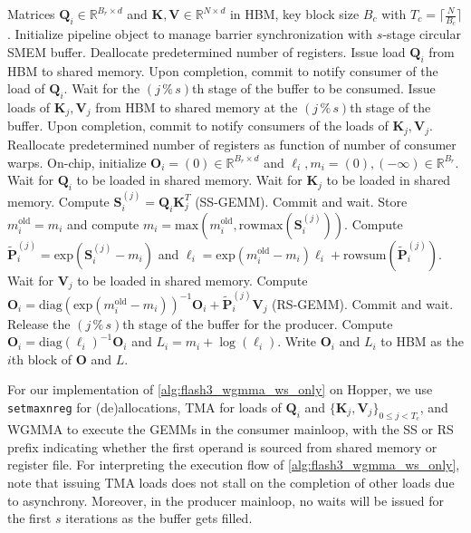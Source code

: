 \documentclass{article}
\renewcommand{\max}{\mathrm{max}}
\renewcommand{\exp}{\mathrm{exp}}
\newcommand{\diag}{\mathrm{diag}}
\newcommand{\rowmax}{\mathrm{rowmax}}
\newcommand{\rowsum}{\mathrm{rowsum}}
\newcommand{\RR}{\mathbb{R}}
\newcommand{\vQ}{\mathbf{Q}}
\newcommand{\vK}{\mathbf{K}}
\newcommand{\vV}{\mathbf{V}}
\newcommand{\vS}{\mathbf{S}}
\newcommand{\vP}{\mathbf{P}}
\newcommand{\vO}{\mathbf{O}}
\newcommand{\fat}{\textsc{FlashAttention-3}\xspace}  %
\begin{document}
\begin{algorithm}[H]
    \caption{\small\label{alg:flash3_wgmma_ws_only}\fat forward pass \textbf{without} intra-consumer overlapping -- CTA view}
    \begin{algorithmic}[1]
\REQUIRE Matrices $\vQ_i \in \RR^{B_r \times d}$ and $\vK, \vV \in \mathbb{R}^{N \times d}$ in HBM, key block size $B_c$ with $T_c = \lceil \frac{N}{B_c} \rceil$.
\STATE Initialize pipeline object to manage barrier synchronization with $s$-stage circular SMEM buffer.
\STATE Deallocate predetermined number of registers.
\STATE Issue load $\vQ_i$ from HBM to shared memory.
\STATE Upon completion, commit to notify consumer of the load of $\vQ_i$.
    \STATE Wait for the $(j\,\%\,s)$th stage of the buffer to be consumed.
    \STATE Issue loads of $\vK_j, \vV_j$ from HBM to shared memory at the $(j\,\%\,s)$th stage of the buffer.
    \STATE Upon completion, commit to notify consumers of the loads of $\vK_j, \vV_j$.
\ENDFOR
\ELSE
\STATE Reallocate predetermined number of registers as function of number of consumer warps.
\STATE On-chip, initialize $\vO_i = (0) \in \mathbb{R}^{B_r \times d}$ and $\ell_i, m_i = (0), (-\infty) \in \mathbb{R}^{B_r}$.
\STATE Wait for $\vQ_i$ to be loaded in shared memory.
\STATE Wait for $\vK_j$ to be loaded in shared memory.
\STATE Compute $\vS_i^{(j)} = \vQ_i \vK_j^T$ (SS-GEMM). Commit and wait. \label{alg:ws_only_gemm1}
\STATE Store $m_i^{\mathrm{old}} = m_i$ and compute $m_i = \max(m_i^{\mathrm{old}}, \rowmax(\vS_i^{(j)}))$. \label{code-ws:softmax_start}
\STATE Compute $\widetilde{\vP}_i^{(j)} = \exp(\vS_i^{(j)} - m_i)$ and $\ell_i = \exp(m_i^{\mathrm{old}} - m_i) \ell_i + \rowsum(\widetilde{\vP}_i^{(j)})$. \label{code-ws:softmax_end}
\STATE Wait for $\vV_j$ to be loaded in shared memory.
\STATE Compute $\vO_i = \diag(\exp(m_i^{\mathrm{old}} - m_i))^{-1} \vO_i + \widetilde{\vP}_i^{(j)} \vV_j$ (RS-GEMM). Commit and wait. \label{alg:ws_only_gemm2}
\STATE Release the $(j\,\%\,s)$th stage of the buffer for the producer.
\ENDFOR
\STATE Compute $\vO_i = \diag(\ell_i)^{-1} \vO_i$ and $L_i = m_i + \log(\ell_i)$.
\STATE Write $\vO_i$ and $L_i$ to HBM as the $i$th block of $\vO$ and $L$.
\ENDIF
\end{algorithmic}
\end{algorithm}

For our implementation of \cref{alg:flash3_wgmma_ws_only} on Hopper, we use \verb|setmaxnreg| for (de)allocations, TMA for loads of $\vQ_i$ and $\{ \vK_j, \vV_j \}_{0 \leq j < T_c}$, and WGMMA to execute the GEMMs in the consumer mainloop, with the SS or RS prefix indicating whether the first operand is sourced from shared memory or register file.
For interpreting the execution flow of \cref{alg:flash3_wgmma_ws_only}, note that issuing TMA loads does not stall on the completion of other loads due to asynchrony.
Moreover, in the producer mainloop, no waits will be issued for the first $s$ iterations as the buffer gets filled.
\end{document}
